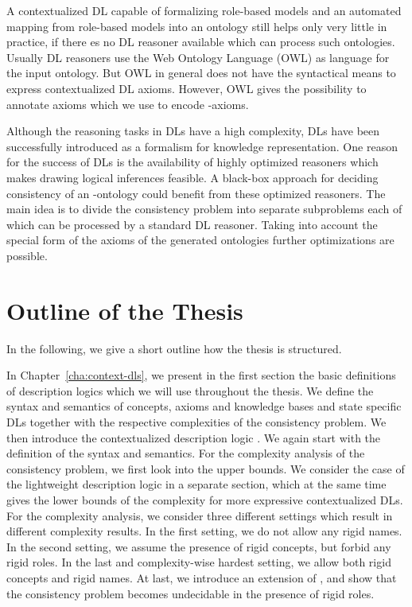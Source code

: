 A contextualized DL capable of formalizing role-based models and an automated mapping from
role-based models into an ontology still helps only very little in practice, if there es no DL reasoner
available which can process such ontologies. 
%
Usually DL reasoners use the Web Ontology Language (OWL) as language for the input ontology. But OWL in
general does not have the syntactical means to express contextualized DL axioms. However, OWL gives
the possibility to annotate axioms which we use to encode \LMLO-axioms.

Although the reasoning tasks in DLs have a high complexity, DLs have been successfully introduced as
a formalism for knowledge representation. One reason for the success of DLs is the availability of
highly optimized reasoners which makes drawing logical inferences feasible. A black-box approach for
deciding consistency of an \LMLO-ontology could benefit from these optimized reasoners. The main
idea is to divide the consistency problem into separate subproblems each of which can be processed
by a standard DL reasoner.
%
Taking into account the special form of the axioms of the generated ontologies further optimizations
are possible.



\section{Outline of the Thesis}
\label{sec:outline-thesis}

In the following, we give a short outline how the thesis is structured.

In Chapter~\ref{cha:context-dls}, we present in the first section the basic definitions of
description logics which we will use throughout the thesis. We define the syntax and semantics of
concepts, axioms and knowledge bases and state specific DLs together with the respective
complexities of the consistency problem.
%
We then introduce the contextualized description logic \LMLO. We again start with the definition of
the syntax and semantics. For the complexity analysis of the consistency problem, we first look into
the upper bounds. We consider the case of the lightweight description logic \EL in a separate
section, which at the same time gives the lower bounds of the complexity for more expressive
contextualized DLs. For the complexity analysis, we consider three different settings which result in
different complexity results. In the first setting, we do not allow any rigid names.  In the
second setting, we assume the presence of rigid concepts, but forbid any rigid roles. In the
last and complexity-wise hardest setting, we allow both rigid concepts and rigid names.
%
At last, we introduce an extension of \LMLO, and show that the consistency problem becomes undecidable
in the presence of rigid roles.

